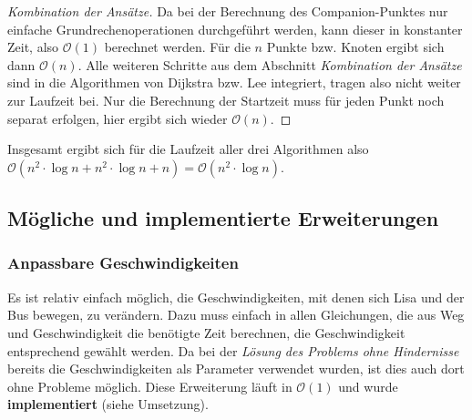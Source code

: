 \documentclass[a4paper, notitlepage, 12pt]{scrartcl}
\begin{document}
\begin{proof}[Kombination der Ansätze]
	Da bei der Berechnung des Companion-Punktes nur einfache Grundrechenoperationen durchgeführt werden, kann dieser in konstanter Zeit, also $\mathcal{O}(1)$ berechnet werden. Für die $n$ Punkte bzw. Knoten ergibt sich dann $\mathcal{O}(n)$. Alle weiteren Schritte aus dem Abschnitt \emph{Kombination der Ansätze} sind in die Algorithmen von Dijkstra bzw. Lee integriert, tragen also nicht weiter zur Laufzeit bei. Nur die Berechnung der Startzeit muss für jeden Punkt noch separat erfolgen, hier ergibt sich wieder $\mathcal{O}(n)$.
\end{proof}
Insgesamt ergibt sich für die Laufzeit aller drei Algorithmen also $\mathcal{O}(n^2 \cdot \log n + n^2 \cdot \log n + n) = \mathcal{O}(n^2 \cdot \log n)$.
 \subsection{Mögliche und implementierte Erweiterungen}
 \subsubsection{Anpassbare Geschwindigkeiten}
 Es ist relativ einfach möglich, die Geschwindigkeiten, mit denen sich Lisa und der Bus bewegen, zu verändern. Dazu muss einfach in allen Gleichungen, die aus Weg und Geschwindigkeit die benötigte Zeit berechnen, die Geschwindigkeit entsprechend gewählt werden. Da bei der \emph{Lösung des Problems ohne Hindernisse} bereits die Geschwindigkeiten als Parameter verwendet wurden, ist dies auch dort ohne Probleme möglich. Diese Erweiterung läuft in $\mathcal{O}(1)$ und wurde \textbf{implementiert} (siehe Umsetzung).
\end{document}
